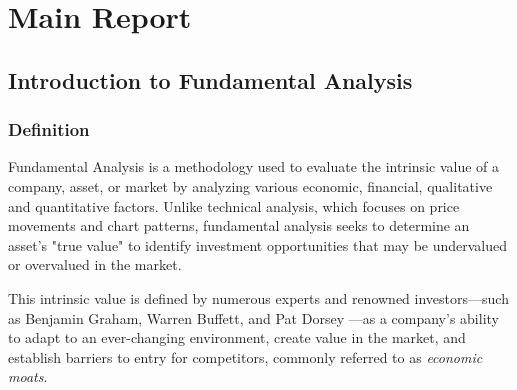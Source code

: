\documentclass[11pt,english,a4paper,hidelinks]{book}
\begin{document}
\tableofcontents
\newpage

\listoffigures
\newpage

\listoftables
\newpage



\clearpage
{}
\setcounter{page}{1}

\part{Main Report}

\chapter{Introduction to Fundamental Analysis}
\section{Definition}

\noindent Fundamental Analysis is a methodology used to evaluate the intrinsic value of a company, asset, or market by analyzing various economic, financial, qualitative and quantitative factors. Unlike technical analysis, which focuses on price movements and chart patterns, fundamental analysis seeks to determine an asset's "true value" to identify investment opportunities that may be undervalued or overvalued in the market.

\vspace{0.5cm}
\noindent This intrinsic value is defined by numerous experts and renowned investors—such as Benjamin Graham, Warren Buffett, and Pat Dorsey \cite{dorsey2011five}—as a company's ability to adapt to an ever-changing environment, create value in the market, and establish barriers to entry for competitors, commonly referred to as \textit{economic moats}.
\end{document}
